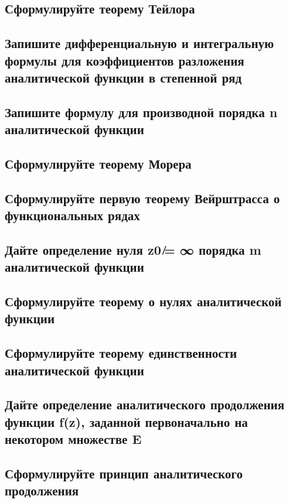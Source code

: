 \subsection{Сформулируйте теорему Тейлора}

\subsection{Запишите дифференциальную и интегральную формулы для коэффициентов
	разложения аналитической функции в степенной ряд}

\subsection{Запишите формулу для производной порядка n аналитической функции}

\subsection{Сформулируйте теорему Морера}

\subsection{Сформулируйте первую теорему Вейрштрасса о функциональных рядах}

\subsection{Дайте определение нуля z0 ̸= ∞ порядка m аналитической функции}

\subsection{Сформулируйте теорему о нулях аналитической функции}

\subsection{Сформулируйте теорему единственности аналитической функции}

\subsection{Дайте определение аналитического продолжения функции f(z), заданной
	первоначально на некотором множестве E}

\subsection{Сформулируйте принцип аналитического продолжения}
